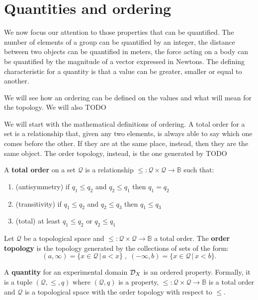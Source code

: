 \documentclass[11pt,letterpaper,fleqn]{memoir} %
\begin{document}
\section{Quantities and ordering}

We now focus our attention to those properties that can be quantified. The number of elements of a group can be quantified by an integer, the distance between two objects can be quantified in meters, the force acting on a body can be quantified by the magnitude of a vector expressed in Newtons. The defining characteristic for a quantity is that a value can be greater, smaller or equal to another.

We will see how an ordering can be defined on the values and what will mean for the topology. We will also  TODO

We will start with the mathematical definitions of ordering. A total order for a set is a relationship that, given any two elements, is always able to say which one comes before the other. If they are at the same place, instead, then they are the same object. The order topology, instead, is the one generated by TODO


\begin{mathSection}
	\begin{defn}
		A \textbf{total order} on a set $\mathcal{Q}$ is a relationship $\leq : \mathcal{Q} \times \mathcal{Q} \to \mathbb{B}$ such that:
		\begin{enumerate}
			\item (antisymmetry) if $q_1 \leq q_2$ and $q_2 \leq q_1$ then $q_1 = q_2$
			\item (transitivity) if $q_1 \leq q_2$ and $q_2 \leq q_3$ then $q_1 \leq q_3$
			\item (total) at least $q_1 \leq q_2$ or $q_2 \leq q_1$
		\end{enumerate}
	\end{defn}
	\begin{defn}
		Let $\mathcal{Q}$ be a topological space and $\leq : \mathcal{Q} \times \mathcal{Q} \to \mathbb{B}$ a total order. The \textbf{order topology} is the topology generated by the collections of sets of the form:
		$$(a, \infty) = \{x \in \mathcal{Q} \, | \, a < x\} \;,\; (-\infty, b) = \{x \in \mathcal{Q} \, | \, x < b\}.$$
	\end{defn}
	\begin{defn}
		A \textbf{quantity} for an experimental domain $\mathcal{D}_X$ is an ordered property. Formally, it is a tuple $(\mathcal{Q}, \leq, q)$ where $(\mathcal{Q}, q)$ is a property, $\leq : \mathcal{Q} \times \mathcal{Q} \to \mathbb{B}$ is a total order and $\mathcal{Q}$ is a topological space with the order topology with respect to $\leq$.
	\end{defn}
\end{mathSection}
\end{document}
